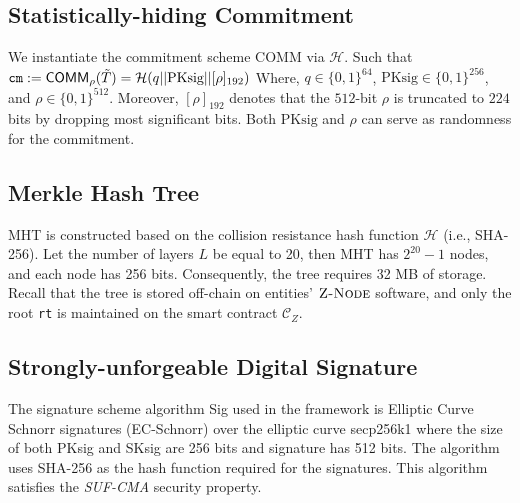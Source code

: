 \subsection{Statistically-hiding Commitment}
We instantiate the commitment scheme \textsf{COMM} via $\mathcal{H}$. Such that 
$\texttt{cm}:=\mathsf{COMM}_\rho(\Tilde{T}) = \mathcal{H}(q||\text{PKsig}||[\rho]_{192})$
Where, $q \in \{0, 1\}^{64}$, $\text{PKsig} \in \{0, 1\}^{256}$, and $\rho \in \{0, 1\}^{512}$. Moreover, $[\rho]_{192}$ denotes that the $512$-bit $\rho$ is truncated to $224$ bits by dropping most significant bits. Both $\text{PKsig}$ and $\rho$ 
can serve as randomness for the commitment. 

\subsection{Merkle Hash Tree}
\textsf{MHT} is constructed based on the collision resistance hash function $\mathcal{H}$ (i.e., SHA-256). Let the number of layers $L$ be equal to 20, then \textsf{MHT} has $2^{20} -1$ nodes, and each node has 256 bits. Consequently, the tree requires 32 MB of storage. Recall that the tree is stored off-chain on entities' $\textsc{Z-Node}$ software, and only the root \texttt{rt} is maintained on the smart contract $\mathcal{C}_Z$.


\subsection{Strongly-unforgeable Digital Signature}

The signature scheme algorithm \textsf{Sig} used in the framework is Elliptic Curve Schnorr signatures (EC-Schnorr) \cite{Schnorr1991Signature} over the elliptic curve secp256k1 \cite{sec2_2010} where the size of both PKsig and SKsig are 256 bits and signature has 512 bits. The algorithm uses SHA-256 as the hash function required for the signatures. This algorithm satisfies the \textit{SUF-CMA} security property.


